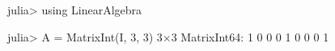 \begin{juliaterm}
julia> using LinearAlgebra

julia> A = Matrix{Int}(I, 3, 3)
3×3 Matrix{Int64}:
 1  0  0
 0  1  0
 0  0  1

\end{juliaterm}
